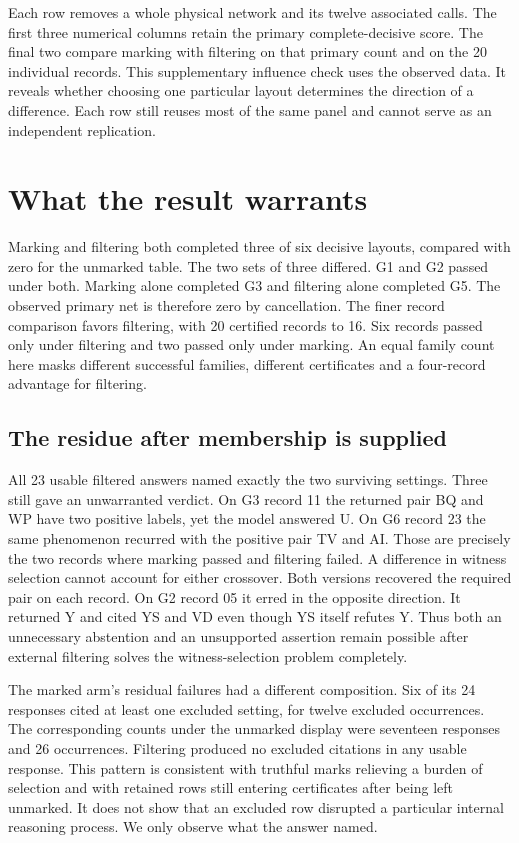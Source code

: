 \documentclass[12pt,letterpaper]{article}
\begin{document}
Each row removes a whole physical network and its twelve associated calls. The first three numerical columns retain the primary complete-decisive score. The final two compare marking with filtering on that primary count and on the 20 individual records. This supplementary influence check uses the observed data. It reveals whether choosing one particular layout determines the direction of a difference. Each row still reuses most of the same panel and cannot serve as an independent replication.

\section{What the result warrants}

Marking and filtering both completed three of six decisive layouts, compared with zero for the unmarked table. The two sets of three differed. G1 and G2 passed under both. Marking alone completed G3 and filtering alone completed G5. The observed primary net is therefore zero by cancellation. The finer record comparison favors filtering, with 20 certified records to 16. Six records passed only under filtering and two passed only under marking. An equal family count here masks different successful families, different certificates and a four-record advantage for filtering.

\subsection{The residue after membership is supplied}

All 23 usable filtered answers named exactly the two surviving settings. Three still gave an unwarranted verdict. On G3 record 11 the returned pair BQ and WP have two positive labels, yet the model answered U. On G6 record 23 the same phenomenon recurred with the positive pair TV and AI. Those are precisely the two records where marking passed and filtering failed. A difference in witness selection cannot account for either crossover. Both versions recovered the required pair on each record. On G2 record 05 it erred in the opposite direction. It returned Y and cited YS and VD even though YS itself refutes Y. Thus both an unnecessary abstention and an unsupported assertion remain possible after external filtering solves the witness-selection problem completely.

The marked arm's residual failures had a different composition. Six of its 24 responses cited at least one excluded setting, for twelve excluded occurrences. The corresponding counts under the unmarked display were seventeen responses and 26 occurrences. Filtering produced no excluded citations in any usable response. This pattern is consistent with truthful marks relieving a burden of selection and with retained rows still entering certificates after being left unmarked. It does not show that an excluded row disrupted a particular internal reasoning process. We only observe what the answer named.
\end{document}
